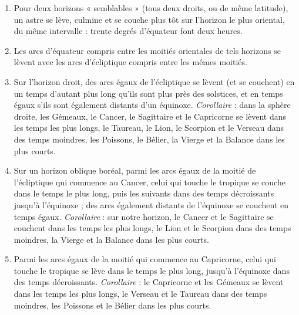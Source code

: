 \documentclass[11pt,a4paper]{article}
\begin{document}
\begin{enumerate}
  \item[14.] Pour deux horizons « semblables » (tous deux droits, ou de même
    latitude), un astre se lève, culmine et se couche plus tôt sur l'horizon le
    plus oriental, du même intervalle : trente degrés d'équateur font deux
    heures.
  \item[15.] Les arcs d'équateur compris entre les moitiés orientales de tels
    horizons se lèvent avec les arcs d'écliptique compris entre les mêmes
    moitiés.
  \item[16.] Sur l'horizon droit, des arcs égaux de l'écliptique se lèvent (et
    se couchent) en un temps d'autant plus long qu'ils sont plus près des
    solstices, et en temps égaux s'ils sont également distants d'un équinoxe.
    \emph{Corollaire} : dans la sphère droite, les Gémeaux, le Cancer, le
    Sagittaire et le Capricorne se lèvent dans les temps les plus longs, le
    Taureau, le Lion, le Scorpion et le Verseau dans des temps moindres, les
    Poissons, le Bélier, la Vierge et la Balance dans les plus courts.
  \item[17.] Sur un horizon oblique boréal, parmi les arcs égaux de la moitié de
    l'écliptique qui commence au Cancer, celui qui touche le tropique se couche
    dans le temps le plus long, puis les suivants dans des temps décroissants
    jusqu'à l'équinoxe ; des arcs également distants de l'équinoxe se couchent
    en temps égaux. \emph{Corollaire} : sur notre horizon, le Cancer et le
    Sagittaire se couchent dans les temps les plus longs, le Lion et le Scorpion
    dans des temps moindres, la Vierge et la Balance dans les plus courts.
  \item[18.] Parmi les arcs égaux de la moitié qui commence au Capricorne, celui
    qui touche le tropique se lève dans le temps le plus long, jusqu'à
    l'équinoxe dans des temps décroissants. \emph{Corollaire} : le Capricorne et
    les Gémeaux se lèvent dans les temps les plus longs, le Verseau et le
    Taureau dans des temps moindres, les Poissons et le Bélier dans les plus
    courts.
\end{enumerate}
\end{document}
